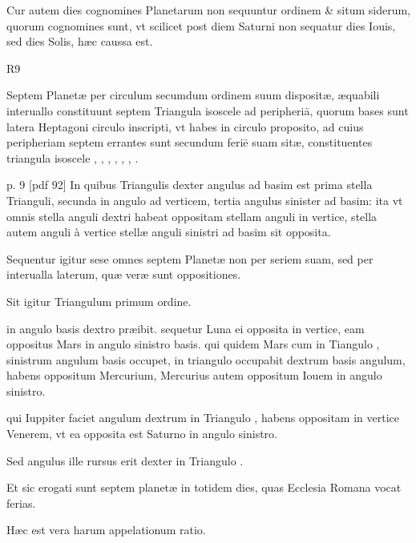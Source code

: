 \begin{parnumbers}
Cur autem dies cognomines Planetarum non sequuntur ordinem \&
situm siderum, quorum cognomines sunt, vt scilicet post diem Saturni
non sequatur dies Iouis, sed dies Solis, hæc caussa est.

\begin{wrapfigure}[9]{R}{9\baselineskip}
  \centering
  \def\svgwidth{9\baselineskip}
  {\astrofont}
\end{wrapfigure}

Septem Planetæ
per circulum secumdum ordinem suum
dispositæ, æquabili interuallo constituunt septem
Triangula isoscele ad peripheriā,  quorum
bases sunt latera Heptagoni circulo inscripti,
vt habes in circulo proposito, ad cuius
peripheriam septem errantes sunt secundum
feriē suam sitæ, constituentes triangula
isoscele , , ,
 , , , .

\clearpage
p. 9 [pdf 92]
In quibus Triangulis dexter angulus ad basim
est prima stella Trianguli, secunda in angulo ad verticem, tertia angulus
sinister ad basim: ita vt omnis stella anguli dextri habeat oppositam
stellam anguli in vertice, stella autem anguli à vertice stellæ
anguli sinistri ad basim sit opposita.

Sequentur igitur sese omnes septem
Planetæ non per seriem suam, sed per interualla laterum, quæ
veræ sunt oppositiones.

Sit igitur Triangulum  primum ordine.

 in angulo basis dextro præibit. sequetur Luna ei opposita in vertice,
eam oppositus Mars in angulo sinistro basis. qui quidem Mars cum in
Tiangulo , sinistrum angulum basis occupet,
 in triangulo  occupabit
dextrum basis angulum, habens oppositum Mercurium,
Mercurius autem oppositum Iouem in angulo sinistro.

qui Iuppiter
faciet angulum dextrum in Triangulo , habens oppositam in vertice
Venerem, vt ea opposita est Saturno in angulo sinistro.

Sed angulus
ille rursus erit dexter in Triangulo .

Et sic erogati sunt septem
planetæ in totidem dies, quas Ecclesia Romana vocat ferias.

Hæc est vera harum appelationum ratio.

\end{parnumbers}

